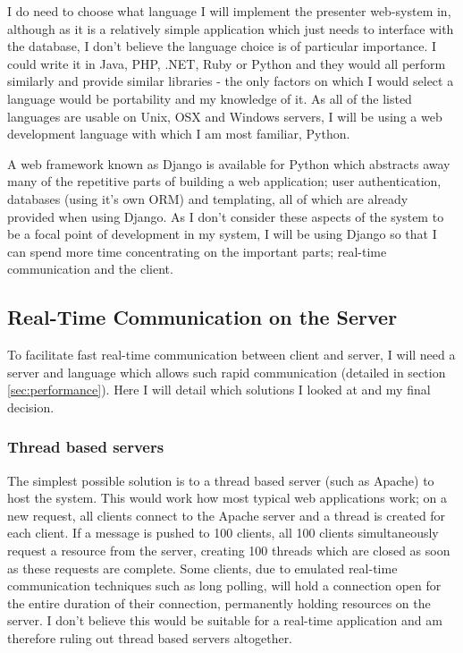 \documentclass[a4papert,11pt,notitlepage]{ltxdoc}
\begin{document}
I do need to choose what language I will implement the presenter web-system in, although as it is a relatively simple application which just needs to interface with the database, I don't believe the language choice is of particular importance. I could write it in Java, PHP, .NET, Ruby or Python and they would all perform similarly and provide similar libraries - the only factors on which I would select a language would be portability and my knowledge of it. As all of the listed languages are usable on Unix, OSX and Windows servers, I will be using a web development language with which I am most familiar, Python.

A web framework known as Django is available for Python which abstracts away many of the repetitive parts of building a web application; user authentication, databases (using it's own ORM) and templating, all of which are already provided when using Django. As I don't consider these aspects of the system to be a focal point of development in my system, I will be using Django so that I can spend more time concentrating on the important parts; real-time communication and the client.

\subsection{Real-Time Communication on the Server}
To facilitate fast real-time communication between client and server, I will need a server and language which allows such rapid communication (detailed in section \ref{sec:performance}). Here I will detail which solutions I looked at and my final decision.

\subsubsection{Thread based servers}
The simplest possible solution is to a thread based server (such as Apache) to host the system. This would work how most typical web applications work; on a new request, all clients connect to the Apache server and a thread is created for each client. If a message is pushed to 100 clients, all 100 clients simultaneously request a resource from the server, creating 100 threads which are closed as soon as these requests are complete. Some clients, due to emulated real-time communication techniques such as long polling, will hold a connection open for the entire duration of their connection, permanently holding resources on the server. I don't believe this would be suitable for a real-time application and am therefore ruling out thread based servers altogether.
\end{document}
